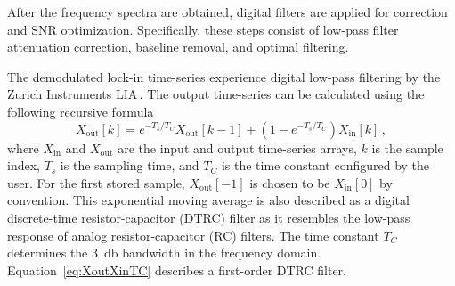 After the frequency spectra are obtained, digital filters are applied for correction and SNR optimization.
Specifically, these steps consist of low-pass filter attenuation correction, baseline removal, and optimal filtering.



The demodulated lock-in time-series experience digital low-pass filtering by the Zurich Instruments LIA\,\cite{ZurichInstruments_MFIA_UserManual}.
The output time-series can be calculated using the following recursive formula
\begin{equation}
    X_\mathrm{out}[k]=e^{-T_s/T_C} X_\mathrm{out}[k-1] + (1 - e^{-T_s/T_C}) X_\mathrm{in}[k]
    \,,
    \label{eq:XoutXinTC}
\end{equation}
where $X_\mathrm{in}$ and $X_\mathrm{out}$ are the input and output time-series arrays, $k$ is the sample index, $T_s$ is the sampling time, and $T_C$ is the time constant configured by the user.
For the first stored sample, $X_\mathrm{out}[-1]$ is chosen to be $X_\mathrm{in}[0]$ by convention.
This exponential moving average is also described as a digital discrete-time resistor-capacitor (DTRC) filter as it resembles the low-pass response of analog resistor-capacitor (RC) filters.
The time constant $T_C$ determines the \SI{3}{\decibel} bandwidth in the frequency domain.
Equation~\eqref{eq:XoutXinTC} describes a first-order DTRC filter.
